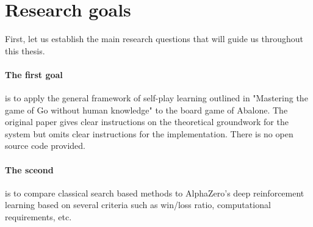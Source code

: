 \section{Research goals}
First, let us establish the main research questions that will guide us throughout this thesis.

\paragraph{The first goal} is to apply the general framework of self-play learning outlined in "Mastering the game of Go without human knowledge" to the board game of Abalone. \cite{silver_mastering_2017} The original paper gives clear instructions on the theoretical groundwork for the system but omits clear instructions for the implementation. There is no open source code provided.

\paragraph{The sceond} is to compare classical search based methods to AlphaZero's deep reinforcement learning based on several criteria such as win/loss ratio, computational requirements, etc.
